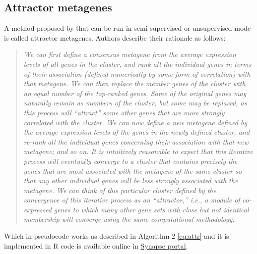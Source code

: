 \documentclass[12pt,]{book}
\theoremstyle{definition}
\theoremstyle{definition}
\theoremstyle{definition}
\theoremstyle{remark}
\begin{document}
\hypertarget{attractor-metagenes}{%
\subsection{Attractor metagenes}\label{attractor-metagenes}}

A method proposed by \citet{Cheng2013} that can be run in
semi-supervised or unsupervised mode is called attractor metagenes.
Authors describe their rationale as follows:

\begin{quote}
\emph{We can first define a consensus metagene from the average
expression levels of all genes in the cluster, and rank all the
individual genes in terms of their association (defined numerically by
some form of correlation) with that metagene. We can then replace the
member genes of the cluster with an equal number of the top-ranked
genes. Some of the original genes may naturally remain as members of the
cluster, but some may be replaced, as this process will ``attract'' some
other genes that are more strongly correlated with the cluster. We can
now define a new metagene defined by the average expression levels of
the genes in the newly defined cluster, and re-rank all the individual
genes concerning their association with that new metagene; and so on. It
is intuitively reasonable to expect that this iterative process will
eventually converge to a cluster that contains precisely the genes that
are most associated with the metagene of the same cluster so that any
other individual genes will be less strongly associated with the
metagene. We can think of this particular cluster defined by the
convergence of this iterative process as an ``attractor,'' i.e., a
module of co-expressed genes to which many other gene sets with close
but not identical membership will converge using the same computational
methodology.}
\end{quote}

Which in pseudocode works as described in Algorithm 2 \eqref{eq:attr} and
it is implemented in R code is available online in
\href{https://www.synapse.org/\#!Synapse:syn1446295}{Synapse portal}.
\end{document}

